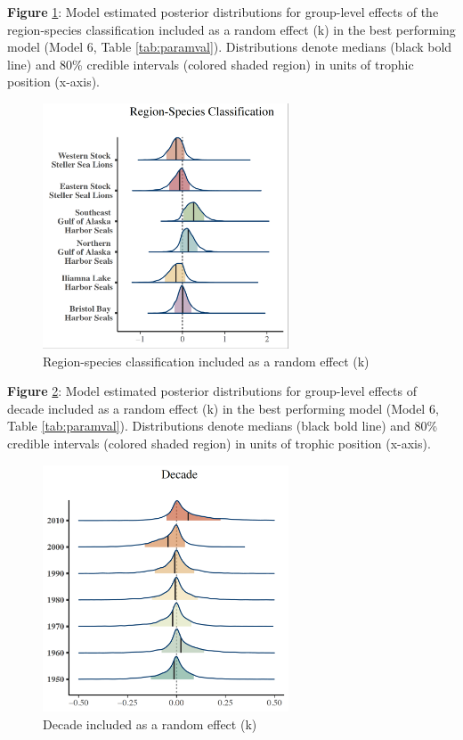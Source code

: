 \documentclass [11pt, proquest] {uwthesis}[2015/03/03]
\begin{document}
\textbf{Figure} \ref{fig:region}: Model estimated posterior
distributions for group-level effects of the region-species
classification included as a random effect (k) in the best performing
model (Model 6, Table \ref{tab:paramval}). Distributions denote medians
(black bold line) and 80\% credible intervals (colored shaded region) in
units of trophic position (x-axis).\\
\newline 
\begin{figure}[h]
\centering
  \includegraphics[width=0.65\textwidth]{figure/Ch4/Figure4.pdf}
  \caption{Region-species classification included as a random effect (k)}
  \label{fig:region}
\end{figure}
\clearpage

\textbf{Figure} \ref{fig:decade}: Model estimated posterior
distributions for group-level effects of decade included as a random
effect (k) in the best performing model (Model 6, Table
\ref{tab:paramval}). Distributions denote medians (black bold line) and
80\% credible intervals (colored shaded region) in units of trophic
position (x-axis). \newline 
\begin{figure}[h]
\centering
  \includegraphics[width=0.65\textwidth]{figure/Ch4/Figure5.pdf}
  \caption{Decade included as a random effect (k)}
  \label{fig:decade}
\end{figure}
\clearpage
\end{document}
